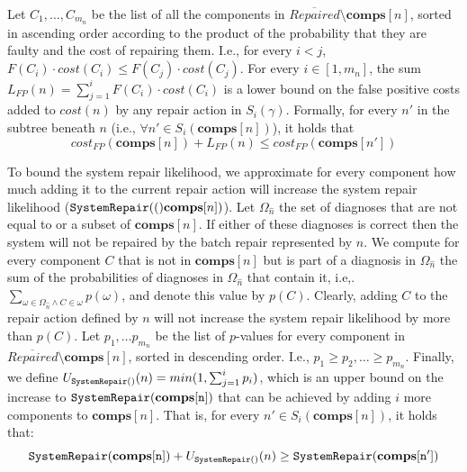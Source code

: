 \documentclass[review]{elsarticle}
\newcommand{\notrepaired}{{\overline{\textit{Repaired}}}}
\newcommand\sysrep[1]{{\tt SystemRepair(#1)}}
\newcommand{\comps}{\textbf{comps}}
\begin{document}
Let $C_1,\ldots, C_{m_n}$ be the list of all the components in $\notrepaired{}\setminus\comps[n]$, sorted in ascending order according to the product of the probability that they are faulty and the cost of repairing them. I.e., for every $i<j$, 
$F(C_i)\cdot cost(C_i)\leq F(C_j)\cdot cost(C_j)$. 
For every $i\in [1,m_n]$, the sum $L_{FP}(n)=\sum_{j=1}^i F(C_i)\cdot cost (C_i)$ is a lower bound  on the false positive costs added to $cost(n)$ by any repair action in $S_i(\gamma)$.
Formally, for every $n'$ in the subtree beneath $n$ (i.e., $\forall n'\in S_i(\comps[n])$), it holds that
\begin{equation}
cost_{FP}(\comps[n])+ L_{FP}(n) \leq cost_{FP}(\comps[n'])
\label{eq:fp-bound}
\end{equation}


To bound the system repair likelihood, we approximate for every component how much adding it to the current repair action will increase the system repair likelihood ($\sysrep(\comps[n])$). Let  $\Omega_{\hat{n}}$ the set of diagnoses that are not equal to or a subset of $\comps[n]$. If either of these diagnoses is correct then the system will not be repaired by the batch repair represented by $n$. 
We compute for every component $C$ that is not in $\comps[n]$ but is part of a  diagnosis in $\Omega_{\hat{n}}$ the sum of the probabilities of diagnoses in $\Omega_{\hat{n}}$ that contain it, i.e,. 
\( \sum_{\omega\in \Omega_{\hat{n}}\wedge C\in \omega} p(\omega) \), 
and denote this value by $p(C)$. Clearly, adding $C$ to the repair action defined by $n$ will not increase the system repair likelihood by more than $p(C)$. 
Let $p_1, \ldots p_{m_n}$ be the list of $p$-values for every component in 
$\notrepaired{}\setminus\comps[n]$, sorted in descending order. I.e., $p_1\geq p_2, \ldots \geq p_{m_n}$. 
Finally, we define $U_{\sysrep{}}(n)=min(1, \sum_{j=1}^i p_i)$, which is an upper bound on the increase to $\sysrep{\comps[n]}$ that can be achieved by adding $i$ more components to $\comps[n]$. That is, for every $n'\in S_i(\comps[n])$, it holds that:
\begin{equation}
\sysrep{\comps[n]}+\\ U_{\sysrep{}}(n) 
 \geq  \sysrep{\comps[n']}
\label{eq:sysrep-bound}    
\end{equation}
\end{document}
